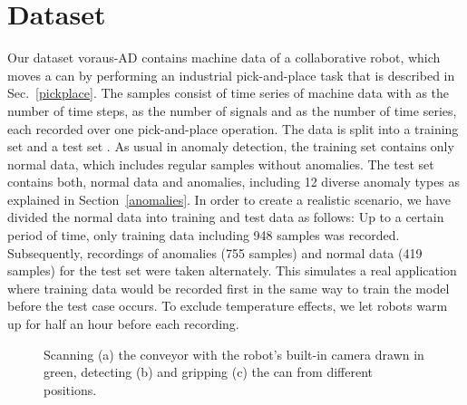 \documentclass[journal]{IEEEtran}
\newcommand\datasetname{voraus-AD}
\begin{document}
\section{Dataset}
Our dataset \datasetname{} contains machine data of a collaborative robot, which moves a can by performing an industrial pick-and-place task that is described in Sec.~\ref{pickplace}.
The samples  consist of time series of machine data  with  as the number of time steps,  as the number of signals {and  as the number of time series}, each recorded over one pick-and-place operation.
The data is split into a training set  and a test set .
As usual in anomaly detection, the training set contains only normal data, which includes regular samples without anomalies.
The test set contains both, normal data and anomalies, including 12 diverse anomaly types as explained in Section~\ref{anomalies}.
In order to create a realistic scenario, we have divided the normal data into training and test data as follows:
Up to a certain period of time, only training data including 948 samples was recorded.
Subsequently, recordings of anomalies (755 samples) and normal data (419 samples) for the test set were taken alternately.
This simulates a real application where training data would be recorded first in the same way to train the model before the test case occurs.
{To exclude temperature effects, we let robots warm up for half an hour before each recording.}

\begin{figure}
  \centering
  \newcommand\PickImgWidth{0.2}
  \caption{Scanning (a) the conveyor with the robot's built-in camera drawn in green, detecting (b) and gripping (c) the can from different positions.}
  \label{fig:object_detection}
\end{figure}
\end{document}
